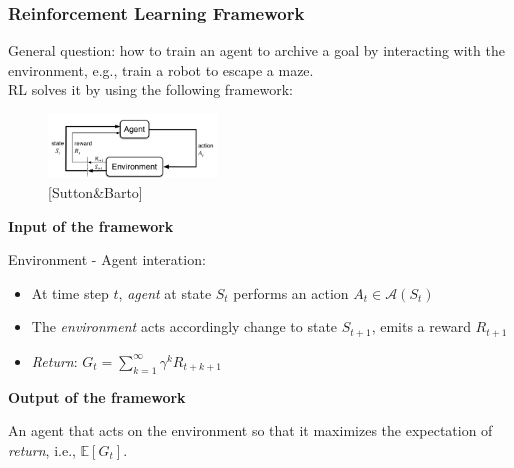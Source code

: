 \documentclass[10pt]{beamer}
\theoremstyle{remark}
\begin{document}
\begin{frame}
    \frametitle{Reinforcement Learning Framework}
    General question: how to train an agent to archive a goal by interacting with the environment, e.g., train a robot to escape a maze. \\

    RL solves it by using the following framework:
    \begin{figure}
        \includegraphics[width=0.4\textwidth]{figures/agent-environment.png}
        \caption{[Sutton\&Barto]}
   \end{figure}
   \textbf{Input of the framework}

   Environment - Agent interation:
   \begin{itemize}
       \item At time step $t$, \textit{agent} at state $S_t$ performs an action $A_t \in \mathcal{A}(S_t)$
       \item The \textit{environment} acts accordingly change to state $S_{t+1}$, emits a reward $R_{t+1}$
       \item \textit{Return}: $G_t = \sum^{\infty}_{k=1} \gamma^{k}R_{t+k+1}$
   \end{itemize}
   \textbf{Output of the framework}

   An agent that acts on the environment so that it maximizes the expectation of \textit{return}, i.e., $ \mathbb{E}[G_t]$.
\end{frame}
\end{document}
